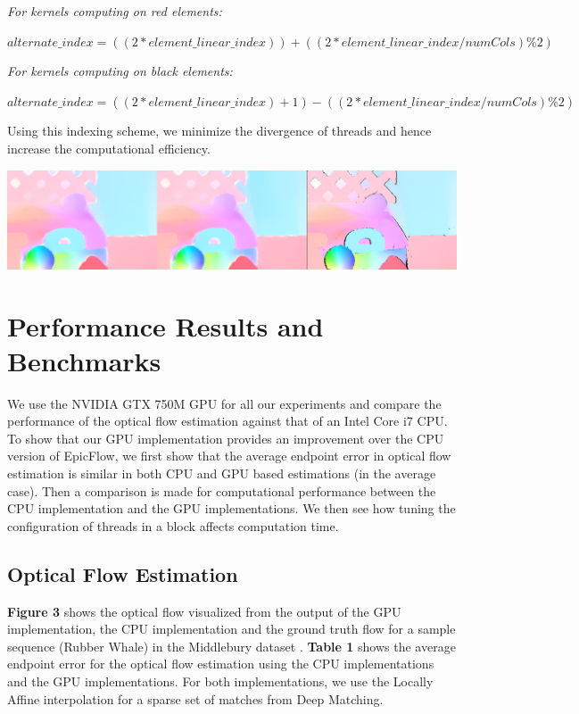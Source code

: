 \documentclass[english]{article}
\begin{document}
	\textit{For kernels computing on red elements:}
	\begin{center}	
	$alternate\_index = ((2*element\_linear\_index)) + ((2 * element\_linear\_index/numCols) \% 2)$
	\end{center}

	\textit{For kernels computing on black elements:}
	\begin{center}	
	$alternate\_index = ((2*element\_linear\_index)+1) - ((2 * element\_linear\_index/numCols) \% 2)$
	\end{center}

	Using this indexing scheme, we minimize the divergence of threads and hence increase the computational efficiency. 

	\begin{center}
	\includegraphics[width=170mm]{results/images/3_cpu_gpu_gt.png}
	\end{center}

	\section{Performance Results and Benchmarks}
	We use the NVIDIA GTX 750M GPU for all our experiments and compare the performance of the optical flow estimation against that of an Intel Core i7 CPU. To show that our GPU implementation provides an improvement over the CPU version of EpicFlow, we first show that the average endpoint error in optical flow estimation is similar in both CPU and GPU based estimations (in the average case). Then a comparison is made for computational performance between the CPU implementation and the GPU implementations. We then see how tuning the configuration of threads in a block affects computation time.

	\subsection{Optical Flow Estimation}
	\textbf{Figure 3} shows the optical flow visualized from the output of the GPU implementation, the CPU implementation and the ground truth flow for a sample sequence (Rubber Whale) in the Middlebury dataset \cite{12}. \textbf{Table 1} shows the average endpoint error for the optical flow estimation using the CPU implementations and the GPU implementations. For both implementations, we use the Locally Affine interpolation for a sparse set of matches from Deep Matching. 
\end{document}
